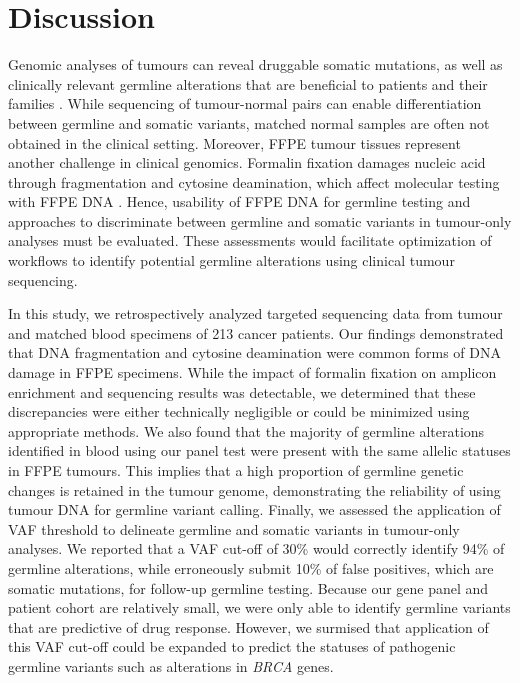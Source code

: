 
\chapter{Discussion}
\label{ch:Discussion}

Genomic analyses of tumours can reveal druggable somatic mutations, as well as clinically relevant germline alterations that are beneficial to patients and their families \cite{Meric-Bernstam2016, Schrader2015, Jones2015a}. While sequencing of tumour-normal pairs can enable differentiation between germline and somatic variants, matched normal samples are often not obtained in the clinical setting. Moreover, FFPE tumour tissues represent another challenge in clinical genomics. Formalin fixation damages nucleic acid through fragmentation and cytosine deamination, which affect molecular testing with FFPE DNA \cite{Do2015a, Kim2017, Ofner2017, Oh2015, Wong2013, Wong2014, Sikorsky2007}. Hence, usability of FFPE DNA for germline testing and approaches to discriminate between germline and somatic variants in tumour-only analyses must be evaluated. These assessments would facilitate optimization of workflows to identify potential germline alterations using clinical tumour sequencing.

In this study, we retrospectively analyzed targeted sequencing data from tumour and matched blood specimens of 213 cancer patients. Our findings demonstrated that DNA fragmentation and cytosine deamination were common forms of DNA damage in FFPE specimens. While the impact of formalin fixation on amplicon enrichment and sequencing results was detectable, we determined that these discrepancies were either technically negligible or could be minimized using appropriate methods. We also found that the majority of germline alterations identified in blood using our panel test were present with the same allelic statuses in FFPE tumours. This implies that a high proportion of germline genetic changes is retained in the tumour genome, demonstrating the reliability of using tumour DNA for germline variant calling. Finally, we assessed the application of VAF threshold to delineate germline and somatic variants in tumour-only analyses. We reported that a VAF cut-off of 30\% would correctly identify 94\% of germline alterations, while erroneously submit 10\% of false positives, which are somatic mutations, for follow-up germline testing. Because our gene panel and patient cohort are relatively small, we were only able to identify germline variants that are predictive of drug response. However, we surmised that application of this VAF cut-off could be expanded to predict the statuses of pathogenic germline variants such as alterations in \textit{BRCA} genes.


